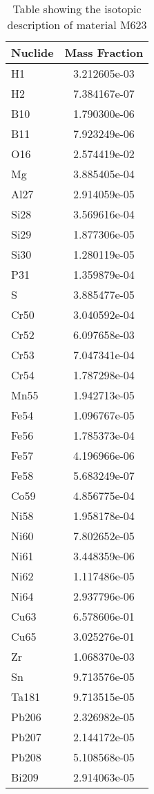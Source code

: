 \begin{centering}
\begin{table}[ht!]
\begin{tabular}{l | c}
\hline
Nuclide & Mass Fraction\\
\hline
H1 & 3.212605e-03\\
H2 & 7.384167e-07\\
B10 & 1.790300e-06\\
B11 & 7.923249e-06\\
O16 & 2.574419e-02\\
Mg & 3.885405e-04\\
Al27 & 2.914059e-05\\
Si28 & 3.569616e-04\\
Si29 & 1.877306e-05\\
Si30 & 1.280119e-05\\
P31 & 1.359879e-04\\
S & 3.885477e-05\\
Cr50 & 3.040592e-04\\
Cr52 & 6.097658e-03\\
Cr53 & 7.047341e-04\\
Cr54 & 1.787298e-04\\
Mn55 & 1.942713e-05\\
Fe54 & 1.096767e-05\\
Fe56 & 1.785373e-04\\
Fe57 & 4.196966e-06\\
Fe58 & 5.683249e-07\\
Co59 & 4.856775e-04\\
Ni58 & 1.958178e-04\\
Ni60 & 7.802652e-05\\
Ni61 & 3.448359e-06\\
Ni62 & 1.117486e-05\\
Ni64 & 2.937796e-06\\
Cu63 & 6.578606e-01\\
Cu65 & 3.025276e-01\\
Zr & 1.068370e-03\\
Sn & 9.713576e-05\\
Ta181 & 9.713515e-05\\
Pb206 & 2.326982e-05\\
Pb207 & 2.144172e-05\\
Pb208 & 5.108568e-05\\
Bi209 & 2.914063e-05
\end{tabular}
\caption{Table showing the isotopic description of material M623}
\label{table:material_M623}
\end{table}\clearpage


\end{centering}
